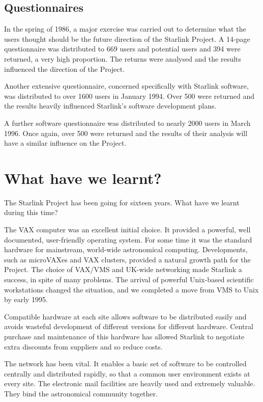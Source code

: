 \documentclass[twoside,11pt]{article}
\begin{document}
\subsection*{Questionnaires}

In the spring of 1986, a major exercise was carried out to determine what the
users thought should be the future direction of the Starlink Project.
A 14-page questionnaire was distributed to 669 users and potential users and
394 were returned, a very high proportion.
The returns were analysed and the results influenced the direction of the
Project.

Another extensive questionnaire, concerned specifically with Starlink software,
was distributed to over 1600 users in January 1994.
Over 500 were returned and the results heavily influenced Starlink's software
development plans.

A further software questionnaire was distributed to nearly 2000 users in March
1996.
Once again, over 500 were returned and the results of their analysis will have
a similar influence on the Project.

\newpage

\section*{What have we learnt?}

The Starlink Project has been going for sixteen years.
What have we learnt during this time?

The VAX computer was an excellent initial choice.
It provided a powerful, well documented, user-friendly operating system.
For some time it was the standard hardware for mainstream, world-wide
astronomical computing.
Developments, such as microVAXes and VAX clusters, provided a natural growth
path for the Project.
The choice of VAX/VMS and UK-wide networking made Starlink a success, in spite
of many problems.
The arrival of powerful Unix-based scientific workstations changed the
situation, and we completed a move from VMS to Unix by early 1995.

Compatible hardware at each site allows software to be distributed easily
and avoids wasteful development of different versions for different
hardware.
Central purchase and maintenance of this hardware has allowed Starlink to
negotiate extra discounts from suppliers and so reduce costs.

The network has been vital.
It enables a basic set of software to be controlled centrally and distributed
rapidly, so that a common user environment exists at every site.
The electronic mail facilities are heavily used and extremely valuable.
They bind the astronomical community together.
\end{document}
